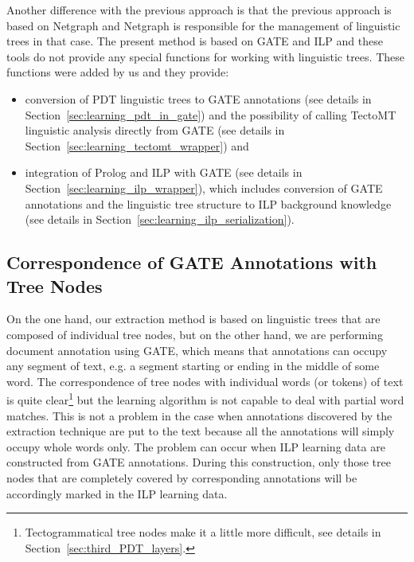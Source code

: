 Another difference with the previous approach is that the previous approach is based on Netgraph and Netgraph is responsible for the management of linguistic trees in that case. The present method is based on GATE and ILP and these tools do not provide any special functions for working with linguistic trees. These functions were added by us and they provide:
\begin{itemize}	
	\item conversion of PDT linguistic trees to GATE annotations (see details in Section~\ref{sec:learning_pdt_in_gate}) and the possibility of calling TectoMT linguistic analysis directly from GATE (see details in Section~\ref{sec:learning_tectomt_wrapper}) and
	
	\item integration of Prolog and ILP with GATE (see details in Section~\ref{sec:learning_ilp_wrapper}), which includes conversion of GATE annotations and the linguistic tree structure to ILP background knowledge (see details in Section~\ref{sec:learning_ilp_serialization}).
\end{itemize}





\subsection{Correspondence of GATE Annotations with Tree Nodes}

On the one hand, our extraction method is based on linguistic trees that are composed of individual tree nodes, but on the other hand, we are performing document annotation using GATE, which means that annotations can occupy any segment of text, e.g. a segment starting or ending in the middle of some word. The correspondence of tree nodes with individual words (or tokens) of text is quite clear\footnote{Tectogrammatical tree nodes make it a little more difficult, see details in Section~\ref{sec:third_PDT_layers}.} but the learning algorithm is not capable to deal with partial word matches. This is not a problem in the case when annotations discovered by the extraction technique are put to the text because all the annotations will simply occupy whole words only. The problem can occur when ILP learning data are constructed from GATE annotations. During this construction, only those tree nodes that are completely covered by corresponding annotations will be accordingly marked in the ILP learning data.


